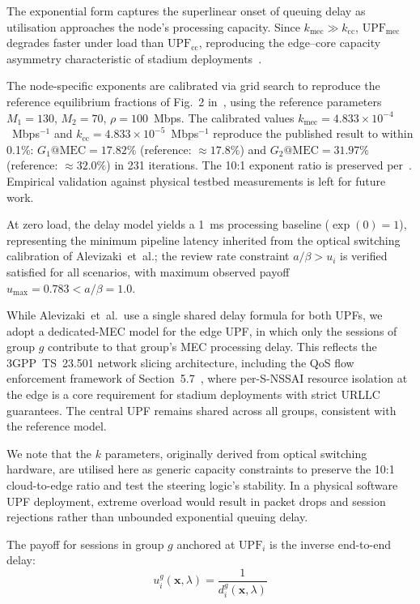 \documentclass[conference]{IEEEtran}
\begin{document}
The exponential form captures the superlinear onset of
queuing delay as utilisation approaches the node's
processing capacity. Since $k_\text{mec} \gg k_\text{cc}$,
$\text{UPF}_\text{mec}$ degrades faster under load than
$\text{UPF}_\text{cc}$, reproducing the edge--core
capacity asymmetry characteristic of stadium
deployments~\cite{nokia_live_events}.

The node-specific exponents are calibrated via grid search
to reproduce the reference equilibrium fractions of Fig.~2
in~\cite{Alevizaki2021upf}, using the reference parameters
$M_1=130$, $M_2=70$, $\rho=100$~Mbps. The calibrated
values $k_\text{mec} = 4.833\times10^{-4}$~Mbps$^{-1}$
and $k_\text{cc} = 4.833\times10^{-5}$~Mbps$^{-1}$
reproduce the published result to within 0.1\%:
$G_1\text{@MEC} = 17.82\%$ (reference: $\approx 17.8\%$)
and $G_2\text{@MEC} = 31.97\%$ (reference: $\approx 32.0\%$)
in 231 iterations. The 10:1 exponent ratio is preserved
per~\cite{Alevizaki2021upf}. Empirical validation against
physical testbed measurements is left for future work.

At zero load, the delay model yields a 1~ms processing baseline
($\exp(0) = 1$), representing the minimum pipeline latency inherited
from the optical switching calibration of Alevizaki~et~al.; the
review rate constraint $a/\beta > u_i$ is verified satisfied for all
scenarios, with maximum observed payoff $u_\text{max} = 0.783
< a/\beta = 1.0$.

While Alevizaki~et~al.\ use a single shared delay formula for
both UPFs, we adopt a dedicated-MEC model for the edge UPF, in
which only the sessions of group $g$ contribute to that group's
MEC processing delay. This reflects the 3GPP~TS~23.501 network
slicing architecture, including the QoS flow enforcement framework
of Section~5.7~\cite{3gpp_ts23501}, where per-S-NSSAI resource
isolation at the edge is a core requirement for stadium
deployments with strict URLLC guarantees. The central UPF remains
shared across all groups, consistent with the reference model.

We note that the $k$ parameters, originally derived from optical
switching hardware, are utilised here as generic capacity
constraints to preserve the 10:1 cloud-to-edge ratio and test
the steering logic's stability. In a physical software UPF
deployment, extreme overload would result in packet drops and
session rejections rather than unbounded exponential queuing delay.

The payoff for sessions in group $g$ anchored at
$\text{UPF}_i$ is the inverse end-to-end delay:
\begin{equation}
    u_i^g(\mathbf{x},\lambda) =
    \frac{1}{d_i^g(\mathbf{x},\lambda)}
    \label{eq:payoff}
\end{equation}
\end{document}
